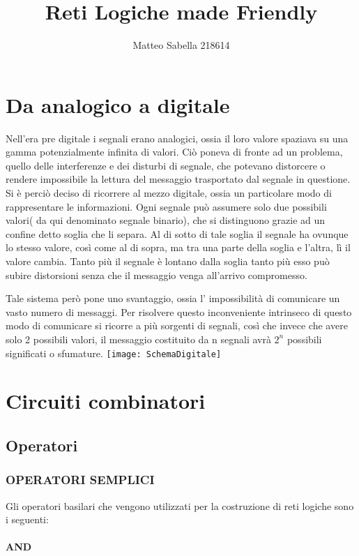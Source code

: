 \documentclass{book}
\title{Reti Logiche made Friendly}
\author{Matteo Sabella 218614}
\begin{document}
\maketitle

\chapter{Da analogico a digitale}
Nell'era pre digitale i segnali erano analogici, ossia il loro valore spaziava su una gamma potenzialmente infinita di valori.
Ciò poneva di fronte ad un problema, quello delle interferenze e dei disturbi di segnale, che potevano distorcere o rendere impossibile la lettura del messaggio trasportato dal segnale in questione.
Si è perciò deciso di ricorrere al mezzo digitale, ossia un particolare modo di rappresentare le informazioni.
Ogni segnale può assumere solo due possibili valori( da qui denominato segnale binario), che si distinguono grazie ad un confine detto soglia che li separa.
Al di sotto di tale soglia il segnale ha ovunque lo stesso valore, così come al di sopra, ma tra una parte della soglia e l'altra, lì il valore cambia.
Tanto più il segnale è lontano dalla soglia tanto più esso può subire distorsioni senza che il messaggio venga all'arrivo compromesso.

Tale sistema però pone uno svantaggio, ossia l' impossibilità di comunicare un vasto numero di messaggi.
Per risolvere questo inconveniente intrinseco di questo modo di comunicare si ricorre a più sorgenti di segnali, così che invece che avere solo 2 possibili valori, il messaggio costituito da n segnali avrà \(2^n\) possibili significati o sfumature.\newline\break\break
\texttt{[image: SchemaDigitale]}
\chapter{Circuiti combinatori}
\section{Operatori}
\subsection{OPERATORI SEMPLICI}
Gli operatori basilari che vengono utilizzati per la costruzione di reti logiche sono i seguenti:\newline
\subsubsection*{AND}
\end{document}
